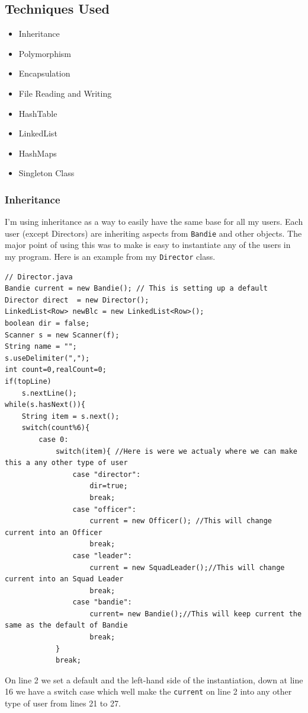 \documentclass{article}
\begin{document}
\subsection{Techniques Used}
\begin{itemize}
	\item Inheritance
	\item Polymorphism
	\item Encapsulation
	\item File Reading and Writing
	\item HashTable
	\item LinkedList
	\item HashMaps
	\item Singleton Class
\end{itemize}
\subsubsection{Inheritance}
I'm using inheritance as a way to easily have the same base for all my users. Each user (except Directors) are inheriting aspects from \verb|Bandie| and other objects. The major point of using this was to make is easy to instantiate any of the users in my program. Here is an example from my \verb|Director| class.
\begin{lstlisting}
// Director.java
Bandie current = new Bandie(); // This is setting up a default
Director direct  = new Director();
LinkedList<Row> newBlc = new LinkedList<Row>();
boolean dir = false;
Scanner s = new Scanner(f);
String name = "";
s.useDelimiter(",");
int count=0,realCount=0;
if(topLine)
	s.nextLine();
while(s.hasNext()){
	String item = s.next();
	switch(count%6){
		case 0:
			switch(item){ //Here is were we actualy where we can make this a any other type of user
				case "director":
					dir=true;
					break;
				case "officer":
					current = new Officer(); //This will change current into an Officer
					break;
				case "leader":
					current = new SquadLeader();//This will change current into an Squad Leader
					break;
				case "bandie":
					current= new Bandie();//This will keep current the same as the default of Bandie
					break;
			}
			break;
\end{lstlisting}
On line 2 we set a default and the left-hand side of the instantiation, down at line 16 we have a switch case which well make the \verb|current| on line 2 into any other type of user from lines 21 to 27. 
\end{document}
